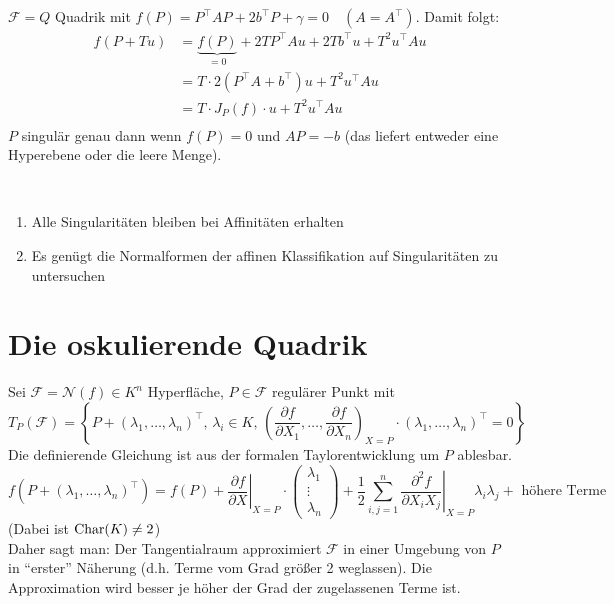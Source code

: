 \documentclass[parskip,a4paper,twoside,DIV15,BCOR12mm]{scrbook}
\begin{document}
\begin{example}
\(\mathcal{F}=Q\) Quadrik mit \(f(P)=P^{\top}AP+2b^{\top}P+\gamma=0\quad
    \left(A=A^{\top}\right)\). Damit folgt:
\begin{align*}
f(P+Tu)&=\underbrace{f(P)}_{=0}+2TP^{\top}Au+2Tb^{\top}u+T^{2}u^{\top}Au\\
&=T\cdot2\left(P^{\top}A+b^{\top}\right)u+T^{2}u^{\top}Au\\
&=T\cdot J_{P}(f)\cdot u+T^{2}u^{\top}Au\\
\end{align*}
\(P\) singulär genau dann wenn \(f(P)=0\) und \(AP=-b\) (das liefert entweder
eine Hyperebene oder die leere Menge).
\end{example}

\begin{conclusion}
\
\begin{enumerate}
\item Alle Singularitäten bleiben bei Affinitäten erhalten
\item Es genügt die Normalformen der affinen Klassifikation auf 
    Singularitäten zu untersuchen
\end{enumerate}
\end{conclusion}

\section{Die oskulierende Quadrik}

Sei \(\mathcal{F}=\mathcal{N}(f)\in K^{n}\) Hyperfläche, \(P\in\mathcal{F}\)
regulärer Punkt mit
\[
T_{P}(\mathcal{F})=
    \left\{P+(\lambda_{1},\ldots,\lambda_{n})^{\top},\,
\lambda_{i}\in K,\,\left(\frac{\partial f}{\partial X_{1}},\ldots,
    \frac{\partial f}{\partial X_{n}}\right)_{X=P}\cdot
    (\lambda_{1},\ldots,\lambda_{n})^{\top}=0\right\}
\]
Die definierende Gleichung ist aus der formalen Taylorentwicklung um \(P\)
ablesbar.
\[
f\left(P+(\lambda_{1},\ldots,\lambda_{n})^{\top}\right)=f(P)+
    \left.\frac{\partial f}{\partial X}\right|_{X=P}\cdot
    \begin{pmatrix}\lambda_{1}\\\vdots\\\lambda_{n}\end{pmatrix}+\frac{1}{2}
    \sum_{i,j=1}^{n}{
	\left.\frac{\partial^{2}f}{\partial X_{i}X_{j}}\right|_{X=P}
	\lambda_{i}\lambda_{j}}+\text{ höhere Terme}
\]
(Dabei ist \(\operatorname{Char}(K)\neq2\))\\
Daher sagt man: Der Tangentialraum approximiert \(\mathcal{F}\) in einer
Umgebung von \(P\) in ``erster'' Näherung (d.h. Terme vom Grad größer
2 weglassen).
Die Approximation wird besser je höher der Grad der zugelassenen Terme ist.
\end{document}
